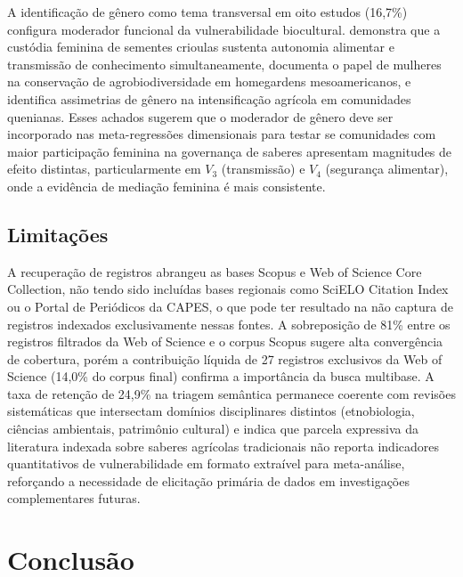A identificação de gênero como tema transversal em oito estudos (16,7\%) configura moderador funcional da vulnerabilidade biocultural.  demonstra que a custódia feminina de sementes crioulas sustenta autonomia alimentar e transmissão de conhecimento simultaneamente,  documenta o papel de mulheres na conservação de agrobiodiversidade em homegardens mesoamericanos, e  identifica assimetrias de gênero na intensificação agrícola em comunidades quenianas. Esses achados sugerem que o moderador de gênero deve ser incorporado nas meta-regressões dimensionais para testar se comunidades com maior participação feminina na governança de saberes apresentam magnitudes de efeito distintas, particularmente em $V_3$ (transmissão) e $V_4$ (segurança alimentar), onde a evidência de mediação feminina é mais consistente.

\subsection{Limitações}
\label{sec:limitations_cap2}

A recuperação de registros abrangeu as bases Scopus e Web of Science Core Collection, não tendo sido incluídas bases regionais como SciELO Citation Index ou o Portal de Periódicos da CAPES, o que pode ter resultado na não captura de registros indexados exclusivamente nessas fontes. A sobreposição de 81\% entre os registros filtrados da Web of Science e o corpus Scopus sugere alta convergência de cobertura, porém a contribuição líquida de 27 registros exclusivos da Web of Science (14,0\% do corpus final) confirma a importância da busca multibase. A taxa de retenção de 24,9\% na triagem semântica permanece coerente com revisões sistemáticas que intersectam domínios disciplinares distintos (etnobiologia, ciências ambientais, patrimônio cultural) e indica que parcela expressiva da literatura indexada sobre saberes agrícolas tradicionais não reporta indicadores quantitativos de vulnerabilidade em formato extraível para meta-análise, reforçando a necessidade de elicitação primária de dados em investigações complementares futuras.

\section{Conclusão}
\label{sec:conclusions_cap2}

